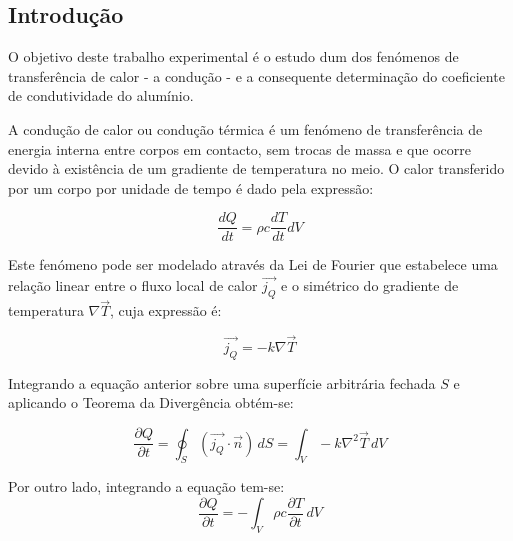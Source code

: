 \documentclass[8pt]{extarticle}
\begin{document}
\begin{multicols}{2}

\section{Introdução}

\par O objetivo deste trabalho experimental é o estudo dum dos fenómenos de transferência de calor - a condução - e a consequente determinação do coeficiente de condutividade do alumínio. 

\par A condução de calor ou condução térmica é um fenómeno de transferência de energia interna entre corpos em contacto, sem trocas de massa e que ocorre devido à existência de um gradiente de temperatura no meio. O calor transferido por um corpo por unidade de tempo é dado pela expressão:

\begin{equation} \label{calor}
\frac{dQ}{dt} = \rho c \frac{dT}{dt} dV
\end{equation}
\begin{center}
\par{}
\end{center}

Este fenómeno pode ser modelado através da Lei de Fourier que estabelece uma relação linear entre o fluxo local de calor $\vec{j_Q}$ e o simétrico do gradiente de temperatura $\nabla\vec{T}$, cuja expressão é:

\begin{equation}
\vec{j_Q} = - k \nabla\vec{T}
\end{equation}
\begin{center}
\par{}
\end{center}

Integrando a equação anterior sobre uma superfície arbitrária fechada $S$ e aplicando o Teorema da Divergência obtém-se:

\begin{equation} \label{3}
\frac{\partial Q}{\partial t} = \oint_S (\vec{j_Q} \cdot \vec{n}) \,dS = \int_V - k \nabla^2 \vec{T} \,dV
\end{equation}

Por outro lado, integrando a equação \label{calor} tem-se:
\begin{equation} \label{4}
\frac{\partial Q}{\partial t} = - \int_V \rho c \frac{\partial T}{\partial t} \,dV
\end{equation}


\end{multicols}
\end{document}
